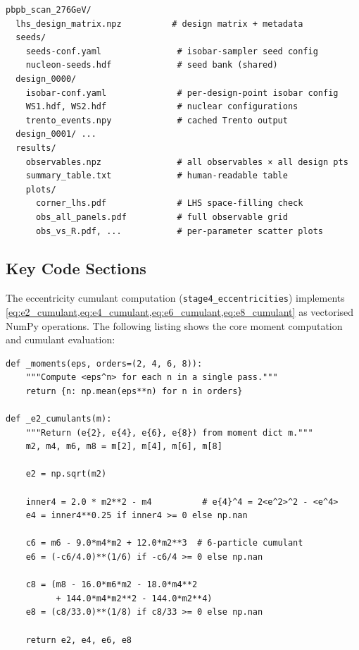 \documentclass[12pt,a4paper,twoside]{report}
\begin{document}
\begin{verbatim}
pbpb_scan_276GeV/
  lhs_design_matrix.npz          # design matrix + metadata
  seeds/
    seeds-conf.yaml               # isobar-sampler seed config
    nucleon-seeds.hdf             # seed bank (shared)
  design_0000/
    isobar-conf.yaml              # per-design-point isobar config
    WS1.hdf, WS2.hdf              # nuclear configurations
    trento_events.npy             # cached Trento output
  design_0001/ ...
  results/
    observables.npz               # all observables × all design pts
    summary_table.txt             # human-readable table
    plots/
      corner_lhs.pdf              # LHS space-filling check
      obs_all_panels.pdf          # full observable grid
      obs_vs_R.pdf, ...           # per-parameter scatter plots
\end{verbatim}

\subsection{Key Code Sections}
\label{subsec:code_sections}

The eccentricity cumulant computation (\texttt{stage4\_eccentricities})
implements \cref{eq:e2_cumulant,eq:e4_cumulant,eq:e6_cumulant,eq:e8_cumulant}
as vectorised NumPy operations.  The following listing shows the core
moment computation and cumulant evaluation:

\begin{lstlisting}[caption={Core eccentricity cumulant computation
  (from \texttt{pbpb\_ultracentral\_scan.py}).},
  label=lst:cumulants]
def _moments(eps, orders=(2, 4, 6, 8)):
    """Compute <eps^n> for each n in a single pass."""
    return {n: np.mean(eps**n) for n in orders}

def _e2_cumulants(m):
    """Return (e{2}, e{4}, e{6}, e{8}) from moment dict m."""
    m2, m4, m6, m8 = m[2], m[4], m[6], m[8]

    e2 = np.sqrt(m2)

    inner4 = 2.0 * m2**2 - m4          # e{4}^4 = 2<e^2>^2 - <e^4>
    e4 = inner4**0.25 if inner4 >= 0 else np.nan

    c6 = m6 - 9.0*m4*m2 + 12.0*m2**3  # 6-particle cumulant
    e6 = (-c6/4.0)**(1/6) if -c6/4 >= 0 else np.nan

    c8 = (m8 - 16.0*m6*m2 - 18.0*m4**2
          + 144.0*m4*m2**2 - 144.0*m2**4)
    e8 = (c8/33.0)**(1/8) if c8/33 >= 0 else np.nan

    return e2, e4, e6, e8
\end{lstlisting}
\end{document}
